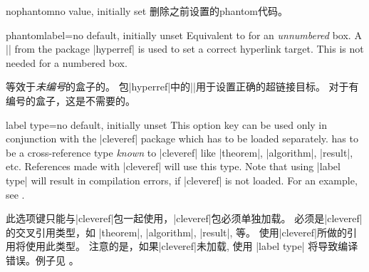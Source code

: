 \begin{docTcbKey}{nophantom}{}{no value, initially set}
删除之前设置的phantom代码。
\end{docTcbKey}



\begin{docTcbKey}[][doc new=2014-11-28]{phantomlabel}{=}{no default, initially unset}
Equivalent to  for an \emph{unnumbered} box.
A || from the package |hyperref| \cite{rahtz:hyperref} is used to set a correct
hyperlink target. This is not needed for a numbered box.

等效于\emph{未编号}的盒子的。%
包|hyperref|中的||用于设置正确的超链接目标。%
对于有编号的盒子，这是不需要的。
\end{docTcbKey}



\begin{docTcbKey}{label type}{=}{no default, initially unset}
This option key can be used only in conjunction with the |cleveref| package
\cite{cubitt:2018a} which has to be loaded separately.
 has to be a cross-reference type \emph{known} to |cleveref|
like |theorem|, |algorithm|, |result|, etc. References made with |cleveref|
will use this type. Note that using |label type| will result in compilation
errors, if |cleveref| is not loaded.
For an example, see .

此选项键只能与|cleveref|包一起使用，|cleveref|包必须单独加载。%
必须是|cleveref|的交叉引用类型，如 |theorem|, |algorithm|, |result|, 等。%
使用|cleveref|所做的引用将使用此类型。%
注意的是，如果|cleveref|未加载, 使用 |label type| 将导致编译错误。例子见 。
\end{docTcbKey}

